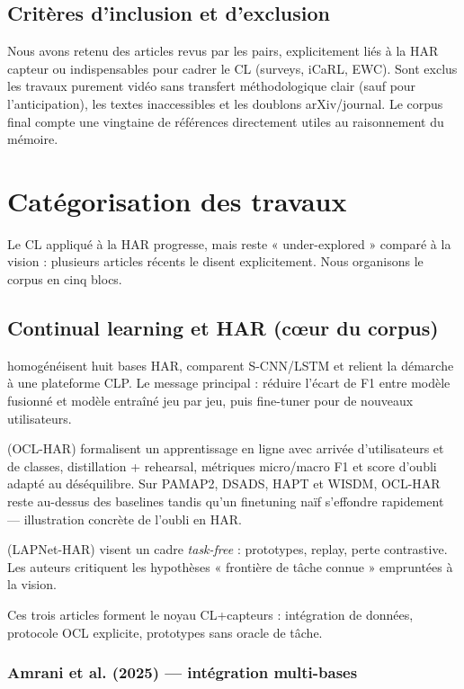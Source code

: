 \documentclass[a4paper,12pt]{report}
\begin{document}
\subsection{Critères d'inclusion et d'exclusion}

Nous avons retenu des articles revus par les pairs, explicitement liés à la HAR
capteur ou indispensables pour cadrer le CL (surveys, iCaRL, EWC). Sont exclus
les travaux purement vidéo sans transfert méthodologique clair (sauf pour
l'anticipation), les textes inaccessibles et les doublons arXiv/journal. Le corpus
final compte une vingtaine de références directement utiles au raisonnement du
mémoire.

\section{Catégorisation des travaux}

Le CL appliqué à la HAR progresse, mais reste « under-explored » comparé à la
vision : plusieurs articles récents le disent explicitement. Nous organisons le
corpus en cinq blocs.

\subsection{Continual learning et HAR (cœur du corpus)}

\textcite{amrani2025} homogénéisent huit bases HAR, comparent S-CNN/LSTM et
relient la démarche à une plateforme CLP. Le message principal : réduire l'écart de
F1 entre modèle fusionné et modèle entraîné jeu par jeu, puis fine-tuner pour de
nouveaux utilisateurs.

\textcite{schiemer2023} (OCL-HAR) formalisent un apprentissage en ligne avec
arrivée d'utilisateurs et de classes, distillation + rehearsal, métriques micro/macro
F1 et score d'oubli adapté au déséquilibre. Sur PAMAP2, DSADS, HAPT et WISDM,
OCL-HAR reste au-dessus des baselines tandis qu'un finetuning naïf s'effondre
rapidement — illustration concrète de l'oubli en HAR.

\textcite{adaimi2022} (LAPNet-HAR) visent un cadre \emph{task-free} :
prototypes, replay, perte contrastive. Les auteurs critiquent les hypothèses
« frontière de tâche connue » empruntées à la vision.

Ces trois articles forment le noyau CL+capteurs : intégration de données,
protocole OCL explicite, prototypes sans oracle de tâche.

\subsubsection{Amrani et al. (2025) — intégration multi-bases}
\end{document}
